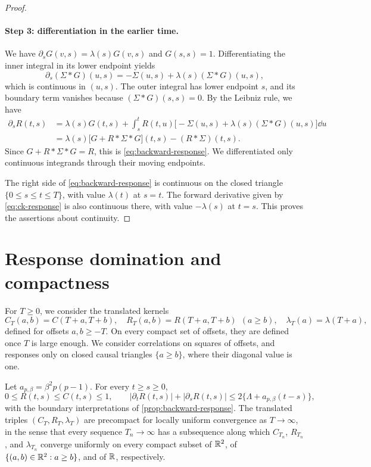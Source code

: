 \begin{proof}
\paragraph{Step 3: differentiation in the earlier time.}
We have $\partial_sG(v,s)=\lambda(s)G(v,s)$ and $G(s,s)=1$. Differentiating the inner integral in its lower endpoint yields
\[
 \partial_s(\Sigma*G)(u,s)=-\Sigma(u,s)+\lambda(s)(\Sigma*G)(u,s),
\]
which is continuous in $(u,s)$. The outer integral has lower endpoint $s$, and its boundary term vanishes because $(\Sigma*G)(s,s)=0$. By the Leibniz rule, we have
\[
\begin{aligned}
 \partial_sR(t,s)&=\lambda(s)G(t,s)+\int_s^tR(t,u)\bigl[-\Sigma(u,s)+\lambda(s)(\Sigma*G)(u,s)\bigr]\dd u\\
 &=\lambda(s)\bigl[G+R*\Sigma*G\bigr](t,s)-(R*\Sigma)(t,s).
\end{aligned}
\]
Since $G+R*\Sigma*G=R$, this is \eqref{eq:backward-response}. We differentiated only continuous integrands through their moving endpoints.

The right side of \eqref{eq:backward-response} is continuous on the closed triangle $\{0\le s\le t\le T\}$, with value $\lambda(t)$ at $s=t$. The forward derivative given by \eqref{eq:ck-response} is also continuous there, with value $-\lambda(s)$ at $t=s$. This proves the assertions about continuity.
\end{proof}

\section{Response domination and compactness}\label{sec:response-compactness}

For $T\ge0$, we consider the translated kernels
\begin{equation}\label{eq:translated-kernels}
 C_T(a,b)=C(T+a,T+b),\quad
 R_T(a,b)=R(T+a,T+b)\ \ (a\ge b),\quad
 \lambda_T(a)=\lambda(T+a),
\end{equation}
defined for offsets $a,b\ge-T$. On every compact set of offsets, they are defined once $T$ is large enough. We consider correlations on squares of offsets, and responses only on closed causal triangles $\{a\ge b\}$, where their diagonal value is one.

\begin{proposition}\label{prop:response-compactness}
Let $a_{p,\beta}=\beta^2p(p-1)$. For every $t\ge s\ge0$,
\begin{equation}
 0\le R(t,s)\le C(t,s)\le1,
 \qquad
 |\partial_tR(t,s)|+|\partial_sR(t,s)|
 \le2\{\Lambda+a_{p,\beta}(t-s)\},
 \label{eq:response-derivative-bounds}
\end{equation}
with the boundary interpretations of \cref{prop:backward-response}. The translated triples $(C_T,R_T,\lambda_T)$ are precompact for locally uniform convergence as $T\to\infty$, in the sense that every sequence $T_n\to\infty$ has a subsequence along which $C_{T_n}$, $R_{T_n}$, and $\lambda_{T_n}$ converge uniformly on every compact subset of $\mathbb R^2$, of $\{(a,b)\in\mathbb R^2:a\ge b\}$, and of $\mathbb R$, respectively.
\end{proposition}

